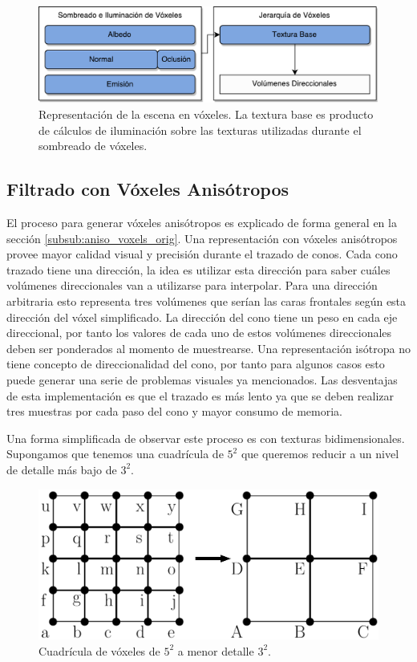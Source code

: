 \begin{figure}[H]
    \centering
    \includegraphics[width=.8\linewidth]{media/representation.pdf}
    \caption{Representación de la escena en vóxeles. La textura base es producto de cálculos de iluminación sobre las texturas utilizadas durante el sombreado de vóxeles.}
\end{figure}
\subsection{Filtrado con Vóxeles Anisótropos} %
\label{sub:voxeles_anisotropos}
El proceso para generar vóxeles anisótropos es explicado de forma general en la sección \ref{subsub:aniso_voxels_orig}. Una representación con vóxeles anisótropos provee mayor calidad visual y precisión durante el trazado de conos. Cada cono trazado tiene una dirección, la idea es utilizar esta dirección para saber cuáles volúmenes direccionales van a utilizarse para interpolar. Para una dirección arbitraria esto representa tres volúmenes que serían las caras frontales según esta dirección del vóxel simplificado. La dirección del cono tiene un peso en cada eje direccional, por tanto los valores de cada uno de estos volúmenes direccionales deben ser ponderados al momento de muestrearse. Una representación isótropa no tiene concepto de direccionalidad del cono, por tanto para algunos casos esto puede generar una serie de problemas visuales ya mencionados. Las desventajas de esta implementación es que el trazado es más lento ya que se deben realizar tres muestras por cada paso del cono y mayor consumo de memoria.

Una forma simplificada de observar este proceso es con texturas bidimensionales. Supongamos que tenemos una cuadrícula de $5^2$ que queremos reducir a un nivel de detalle más bajo de $3^2$.

\begin{figure}[H]
    \centering
    \includegraphics[width=.5\linewidth]{media/filtering_1.pdf}
    \caption{Cuadrícula de vóxeles de $5^2$ a menor detalle $3^2$.}
\end{figure}

